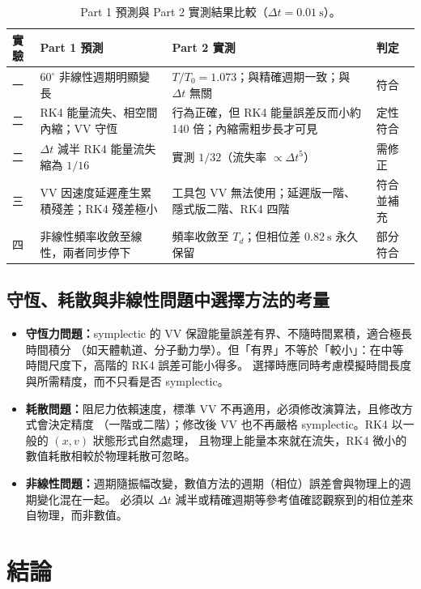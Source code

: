 \documentclass[11pt,a4paper]{article}
\newcommand{\dt}{\Delta t}
\begin{document}
\begin{table}[H]
\centering
\small
\caption{Part 1 預測與 Part 2 實測結果比較（$\dt=0.01~\mathrm{s}$）。}
\begin{tabular}{p{}p{}p{}p{}}
\toprule
實驗 & Part 1 預測 & Part 2 實測 & 判定 \\
\midrule
一 & $60^\circ$ 非線性週期明顯變長 & $T/T_0=1.073$；與精確週期一致；與 $\dt$ 無關 & 符合 \\
二 & RK4 能量流失、相空間內縮；VV 守恆 & 行為正確，但 RK4 能量誤差反而小約 140 倍；內縮需粗步長才可見 & 定性符合 \\
二 & $\dt$ 減半 RK4 能量流失縮為 $1/16$ & 實測 $1/32$（流失率 $\propto\dt^5$） & 需修正 \\
三 & VV 因速度延遲產生累積殘差；RK4 殘差極小 & 工具包 VV 無法使用；延遲版一階、隱式版二階、RK4 四階 & 符合並補充 \\
四 & 非線性頻率收斂至線性，兩者同步停下 & 頻率收斂至 $T_d$；但相位差 $0.82~\mathrm{s}$ 永久保留 & 部分符合 \\
\bottomrule
\end{tabular}
\end{table}

\subsection{守恆、耗散與非線性問題中選擇方法的考量}

\begin{itemize}
  \item \textbf{守恆力問題：}symplectic 的 VV 保證能量誤差有界、不隨時間累積，適合極長時間積分
        （如天體軌道、分子動力學）。但「有界」不等於「較小」：在中等時間尺度下，高階的 RK4 誤差可能小得多。
        選擇時應同時考慮模擬時間長度與所需精度，而不只看是否 symplectic。
  \item \textbf{耗散問題：}阻尼力依賴速度，標準 VV 不再適用，必須修改演算法，且修改方式會決定精度
        （一階或二階）；修改後 VV 也不再嚴格 symplectic。RK4 以一般的 $(x,v)$ 狀態形式自然處理，
        且物理上能量本來就在流失，RK4 微小的數值耗散相較於物理耗散可忽略。
  \item \textbf{非線性問題：}週期隨振幅改變，數值方法的週期（相位）誤差會與物理上的週期變化混在一起。
        必須以 $\dt$ 減半或精確週期等參考值確認觀察到的相位差來自物理，而非數值。
\end{itemize}

\section{結論}
\end{document}
